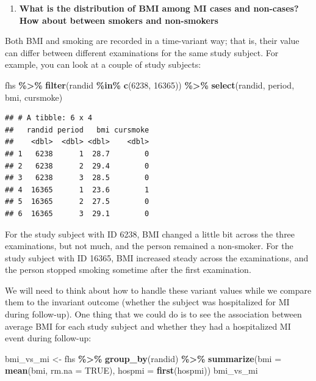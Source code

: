 \documentclass[
]{book}
\newenvironment{Shaded}{\begin{snugshade}}{\end{snugshade}}
\newcommand{\AttributeTok}[1]{\textcolor[rgb]{0.13,0.29,0.53}{#1}}
\newcommand{\ConstantTok}[1]{\textcolor[rgb]{0.56,0.35,0.01}{#1}}
\newcommand{\DecValTok}[1]{\textcolor[rgb]{0.00,0.00,0.81}{#1}}
\newcommand{\FunctionTok}[1]{\textcolor[rgb]{0.13,0.29,0.53}{\textbf{#1}}}
\newcommand{\NormalTok}[1]{#1}
\newcommand{\OtherTok}[1]{\textcolor[rgb]{0.56,0.35,0.01}{#1}}
\newcommand{\SpecialCharTok}[1]{\textcolor[rgb]{0.81,0.36,0.00}{\textbf{#1}}}
\providecommand{\tightlist}{%
  \setlength{\itemsep}{0pt}\setlength{\parskip}{0pt}}
\begin{document}
\begin{enumerate}
\def\labelenumi{\arabic{enumi}.}
\setcounter{enumi}{3}
\tightlist
\item
  \textbf{What is the distribution of BMI among MI cases and non-cases? How about between smokers and non-smokers}
\end{enumerate}

Both BMI and smoking are recorded in a time-variant way; that is, their value can differ between different examinations for the same study subject. For example, you can look at a couple of study subjects:

\begin{Shaded}
\begin{Highlighting}[]
\NormalTok{fhs }\SpecialCharTok{\%\textgreater{}\%} 
  \FunctionTok{filter}\NormalTok{(randid }\SpecialCharTok{\%in\%} \FunctionTok{c}\NormalTok{(}\DecValTok{6238}\NormalTok{, }\DecValTok{16365}\NormalTok{)) }\SpecialCharTok{\%\textgreater{}\%} 
  \FunctionTok{select}\NormalTok{(randid, period, bmi, cursmoke)}
\end{Highlighting}
\end{Shaded}

\begin{verbatim}
## # A tibble: 6 x 4
##   randid period   bmi cursmoke
##    <dbl>  <dbl> <dbl>    <dbl>
## 1   6238      1  28.7        0
## 2   6238      2  29.4        0
## 3   6238      3  28.5        0
## 4  16365      1  23.6        1
## 5  16365      2  27.5        0
## 6  16365      3  29.1        0
\end{verbatim}

For the study subject with ID 6238, BMI changed a little bit across the three examinations, but not much, and the person remained a non-smoker. For the study subject with ID 16365, BMI increased steady across the examinations, and the person stopped smoking sometime after the first examination.

We will need to think about how to handle these variant values while we compare them to the invariant outcome (whether the subject was hospitalized for MI during follow-up). One thing that we could do is to see the association between average BMI for each study subject and whether they had a hospitalized MI event during follow-up:

\begin{Shaded}
\begin{Highlighting}[]
\NormalTok{bmi\_vs\_mi }\OtherTok{\textless{}{-}}\NormalTok{ fhs }\SpecialCharTok{\%\textgreater{}\%} 
  \FunctionTok{group\_by}\NormalTok{(randid) }\SpecialCharTok{\%\textgreater{}\%} 
  \FunctionTok{summarize}\NormalTok{(}\AttributeTok{bmi =} \FunctionTok{mean}\NormalTok{(bmi, }\AttributeTok{rm.na =} \ConstantTok{TRUE}\NormalTok{), }
            \AttributeTok{hospmi =} \FunctionTok{first}\NormalTok{(hospmi))}
\NormalTok{bmi\_vs\_mi}
\end{Highlighting}
\end{Shaded}
\end{document}
